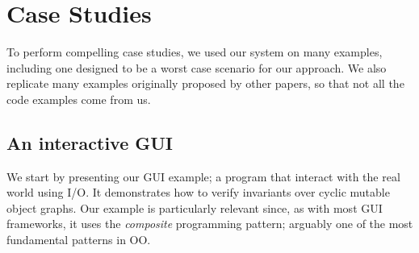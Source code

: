 \SS\section{Case Studies} %
\label{s:case-studyAll}
To perform compelling case studies, we used our system on many examples, including one designed to be a worst case scenario for our approach. We also replicate many examples originally proposed by other papers, so that 
not all the code examples come from us. 

\subsection{An interactive GUI}
\label{s:case-study}
We start by presenting our GUI example; a program that interact with the real world using I/O.
It demonstrates how to verify invariants over cyclic mutable object graphs.
Our example is particularly relevant since, as with most GUI frameworks, it uses the \emph{composite} programming pattern; arguably one of the most fundamental patterns in OO.

